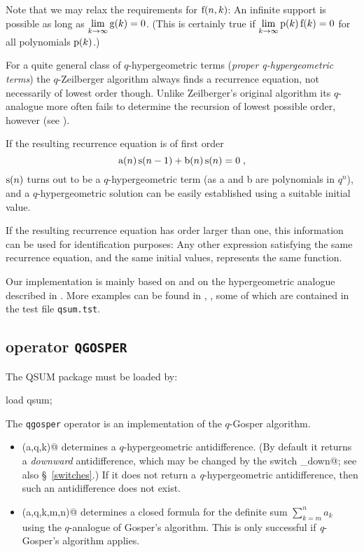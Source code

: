 Note that we may relax the requirements for $\fcn{f}{n,k}$:
An infinite support is possible as long as 
$\lim\limits_{k\rightarrow\infty}{\fcn{g}{k}}=0$. 
(This is certainly true if 
$\lim\limits_{k\rightarrow\infty}{\fcn{p}{k}\,\fcn{f}{k}}=0$ for
all polynomials $\fcn{p}{k}$.)

For a quite general class of $q$-hypergeometric terms 
({\sl proper q-hypergeometric terms}) the $q$-Zeilberger algorithm
always finds a recurrence equation, not necessarily of lowest
order though. Unlike Zeilberger's original algorithm its
$q$-analogue more often fails to determine the recursion of
lowest possible order, however (see \cite{Paule1}).

If the resulting recurrence equation is of first order
\[
	\fcn{a}{n}\,\fcn{s}{n-1}+\fcn{b}{n}\,\fcn{s}{n}=0
\;,
\]
$\fcn{s}{n}$ turns out to be a $q$-hypergeometric term
(as a and b are polynomials in $q^n$),
and a $q$-hypergeometric solution can be easily established using a 
suitable initial value.

If the resulting recurrence equation has order larger than one, 
this information can be used for identification purposes:
Any other expression satisfying the same recurrence equation, and the same
initial values, represents the same function.

Our implementation is mainly based on \cite{Koornwinder} and on the
hypergeometric analogue described in \cite{Koepf1}. 
More examples can be found in \cite{GasperRahman}, \cite{Gasper},
some of which are contained in the test file 
\texttt{qsum.tst}.


\subsection{\REDUCE{} operator \texttt{QGOSPER}}
\label{reduce_qgosper}

The QSUM package must be loaded by:

\begin{redoutput}
\redprompt load qsum;
\end{redoutput}
The \texttt{qgosper} operator is an implementation of the $q$-Gosper
algorithm.
\begin{itemize}
	\item {\verb@qgosper(a,q,k)@} determines a $q$-hypergeometric
		antidifference. (By default it returns a {\sl downward}
		antidifference, which may be changed by the switch 
		{\verb@qgosper_down@}; see also 
		\S~\ref{switches}.)
		If it does not return a \textsl{q}-hypergeometric antidifference,
		then such an antidifference does not exist.
	\item {\verb@qgosper(a,q,k,m,n)@} determines a closed formula
		for the definite sum $\sum\limits_{k=m}^n a_k$ using the
		$q$-analogue of Gosper's algorithm. 
		This is only successful if \textsl{q}-Gosper's algorithm applies.
\end{itemize}

